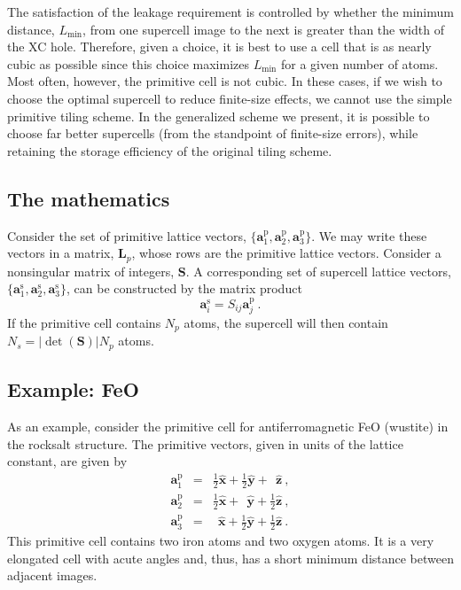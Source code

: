 The satisfaction of the leakage requirement is controlled by whether
the minimum distance, $L_{\text{min}}$, from one supercell image to the
next is greater than the width of the XC hole.  Therefore, given a
choice, it is best to use a cell that is as nearly cubic as possible
since this choice maximizes $L_{\text{min}}$ for a given number of
atoms.  Most often, however, the primitive cell is not cubic.  In
these cases, if we wish to choose the optimal supercell to reduce
finite-size effects, we cannot use the simple primitive tiling
scheme.  In the generalized scheme we present, it is possible to
choose far better supercells (from the standpoint of finite-size
errors), while retaining the storage efficiency of the original tiling
scheme.

\subsection{The mathematics}
\renewcommand{\vp}{\mathbf{a}^{\text{p}}}
\renewcommand{\vs}{\mathbf{a}^{\text{s}}} 
\renewcommand{\Smat}{\mathbf{S}}
Consider the set of primitive lattice vectors, $\{\vp_1, \vp_2,
\vp_3\}$.  We may write these vectors in a matrix, $\mathbf{L}_p$, whose
rows are the primitive lattice vectors.  Consider a nonsingular
matrix of integers, $\Smat$.  A corresponding set of supercell lattice
vectors, $\{\vs_1, \vs_2, \vs_3\}$, can be constructed by the matrix
product 
\begin{equation}
\vs_i = S_{ij} \vp_j\:.
\end{equation}
If the primitive cell contains $N_p$ atoms, the supercell will then
contain $N_s = |\det(\Smat)| N_p$ atoms.

\subsection{Example: FeO}
As an example, consider the primitive cell for antiferromagnetic FeO
(wustite) in the rocksalt structure.  The primitive vectors, given in
units of the lattice constant, are given by
\newcommand{\xv}{\hat{\mathbf{x}}} 
\newcommand{\yv}{\hat{\mathbf{y}}}
\newcommand{\zv}{\hat{\mathbf{z}}}
\begin{eqnarray}
\vp_1 & = & \frac{1}{2}\xv + \frac{1}{2}\yv +      \ \   \zv\:, \\
\vp_2 & = & \frac{1}{2}\xv +      \ \   \yv + \frac{1}{2}\zv\:, \\
\vp_3 & = &   \ \      \xv + \frac{1}{2}\yv + \frac{1}{2}\zv\:. 
\end{eqnarray}
This primitive cell contains two iron atoms and two oxygen atoms. It
is a very elongated cell with acute angles and, thus, has a short
minimum distance between adjacent images.

